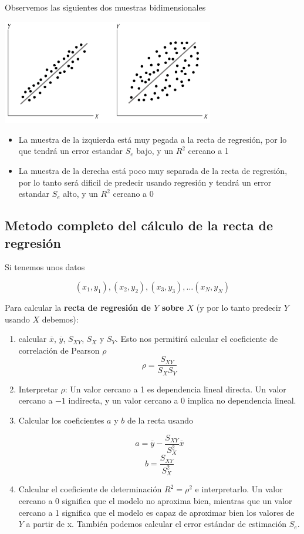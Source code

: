 \documentclass[
]{article}
\providecommand{\tightlist}{%
  \setlength{\itemsep}{0pt}\setlength{\parskip}{0pt}}
\begin{document}
Observemos las siguientes dos muestras bidimensionales

\includegraphics[width=3.64583in,height=\textheight]{error_regression.png}

\begin{itemize}
\tightlist
\item
  La muestra de la izquierda está muy pegada a la recta de regresión,
  por lo que tendrá un error estandar \(S_e\) bajo, y un \(R^2\) cercano
  a 1
\item
  La muestra de la derecha está poco muy separada de la recta de
  regresión, por lo tanto será dificil de predecir usando regresión y
  tendrá un error estandar \(S_e\) alto, y un \(R^2\) cercano a 0
\end{itemize}

\hypertarget{metodo-completo-del-cuxe1lculo-de-la-recta-de-regresiuxf3n}{%
\subsection{Metodo completo del cálculo de la recta de
regresión}\label{metodo-completo-del-cuxe1lculo-de-la-recta-de-regresiuxf3n}}

Si tenemos unos datos

\[(x_1, y_1), (x_2, y_2), (x_3,y_3), \ldots (x_N,y_N)\]

Para calcular la \textbf{recta de regresión de \(Y\) sobre \(X\)} (y por
lo tanto predecir \(Y\) usando \(X\) debemos):

\begin{enumerate}
\def\labelenumi{\arabic{enumi}.}
\item
  calcular \(\overline x\), \(\overline y\), \(S_{XY}\), \(S_X\) y
  \(S_Y\). Esto nos permitirá calcular el coeficiente de correlación de
  Pearson \(\rho\) \[\rho = \frac{S_{XY}}{S_X S_Y}\]
\item
  Interpretar \(\rho\): Un valor cercano a 1 es dependencia lineal
  directa. Un valor cercano a \(-1\) indirecta, y un valor cercano a 0
  implica no dependencia lineal.
\item
  Calcular los coeficientes \(a\) y \(b\) de la recta usando

  \[a = \overline{y} - \frac{S_{XY}}{S^2_X} \overline x\]
  \[b = \frac{S_{XY}}{S^2_X}\]
\item
  Calcular el coeficiente de determinación \(R^2 = \rho^2\) e
  interpretarlo. Un valor cercano a 0 significa que el modelo no
  aproxima bien, mientras que un valor cercano a 1 significa que el
  modelo es capaz de aproximar bien los valores de \(Y\) a partir de x.
  También podemos calcular el error estándar de estimación \(S_e\).
\end{enumerate}
\end{document}
